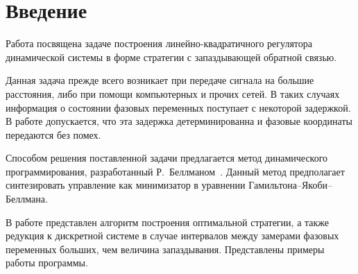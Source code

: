 \section{Введение}

Работа посвящена задаче построения линейно-квадратичного регулятора динамической системы в форме стратегии с запаздывающей обратной связью.

Данная задача прежде всего возникает при передаче сигнала на большие расстояния, либо при помощи компьютерных и прочих сетей.
В таких случаях информация о состоянии фазовых переменных поступает с некоторой задержкой.
В работе допускается, что эта задержка детерминированна и фазовые координаты передаются без помех.

Способом решения поставленной задачи предлагается метод динамического программирования, разработанный Р.~Беллманом~\cite{bellman}.
Данный метод предполагает синтезировать управление как минимизатор в уравнении Гамильтона--Якоби--Беллмана.

В работе представлен алгоритм построения оптимальной стратегии, а также редукция к дискретной системе в случае интервалов между замерами фазовых переменных больших, чем величина запаздывания. Представлены примеры работы программы.